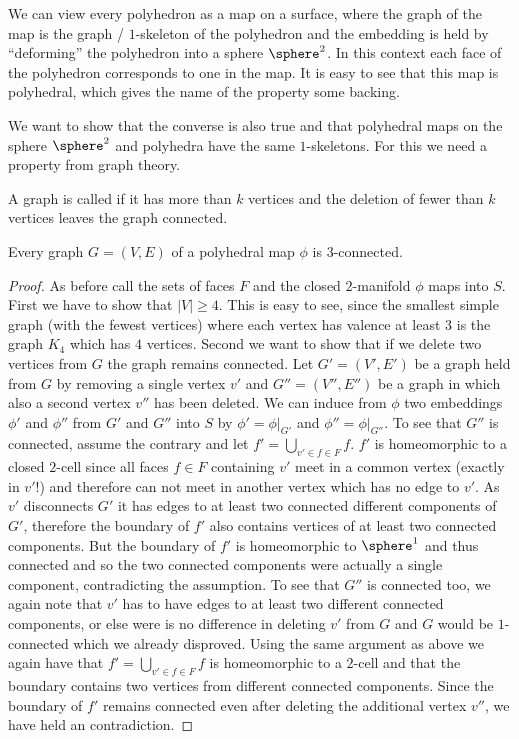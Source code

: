 \begin{remark}\label{rem:polymap:from:polyhedron}
  We can view every polyhedron as a map on a surface, where the graph of the map is the graph / $1$-skeleton of the polyhedron and the embedding is held by ``deforming'' the polyhedron into a sphere $\sphere^2$. In this context each face of the polyhedron corresponds to one in the map. It is easy to see that this map is polyhedral, which gives the name of the property some backing.
\end{remark}

We want to show that the converse is also true and that polyhedral maps on the sphere $\sphere^2$ and polyhedra have the same $1$-skeletons. For this we need a property from graph theory.

\begin{definition} A graph is called  if it has more than $k$ vertices and the deletion of fewer than $k$ vertices leaves the graph connected.
\end{definition}

\begin{proposition} Every graph $G = (V, E)$ of a polyhedral map $\phi$ is $3$-connected.
  \begin{proof}
    As before call the sets of faces $F$ and the closed $2$-manifold $\phi$ maps into $S$. First we have to show that $|V| \geq 4$. This is easy to see, since the smallest simple graph (with the fewest vertices) where each vertex has valence at least $3$ is the graph $K_4$ which has $4$ vertices. Second we want to show that if we delete two vertices from $G$ the graph remains connected. Let $G' = (V', E')$ be a graph held from $G$ by removing a single vertex $v'$ and $G'' = (V'', E'')$ be a graph in which also a second vertex $v''$ has been deleted. We can induce from $\phi$ two embeddings $\phi'$ and $\phi''$ from $G'$ and $G''$ into $S$ by $\phi' = \phi|_{G'}$ and $\phi'' = \phi|_{G''}$. To see that $G''$ is connected, assume the contrary and let $f' = \bigcup_{v' \in f \in F} f$. $f'$ is homeomorphic to a closed $2$-cell since all faces $f \in F$ containing $v'$ meet in a common vertex (exactly in $v'$!) and therefore can not meet in another vertex which has no edge to $v'$. As $v'$ disconnects $G'$ it has edges to at least two connected different components of $G'$, therefore the boundary of $f'$ also contains vertices of at least two connected components. But the boundary of $f'$ is homeomorphic to $\sphere^1$ and thus connected and so the two connected components were actually a single component, contradicting the assumption. To see that $G''$ is connected too, we again note that $v'$ has to have edges to at least two different connected components, or else were is no difference in deleting $v'$ from $G$ and $G$ would be $1$-connected which we already disproved. Using the same argument as above we again have that $f' = \bigcup_{v' \in f \in F} f$ is homeomorphic to a $2$-cell and that the boundary contains two vertices from different connected components. Since the boundary of $f'$ remains connected even after deleting the additional vertex $v''$, we have held an contradiction.
  \end{proof}
\end{proposition}

